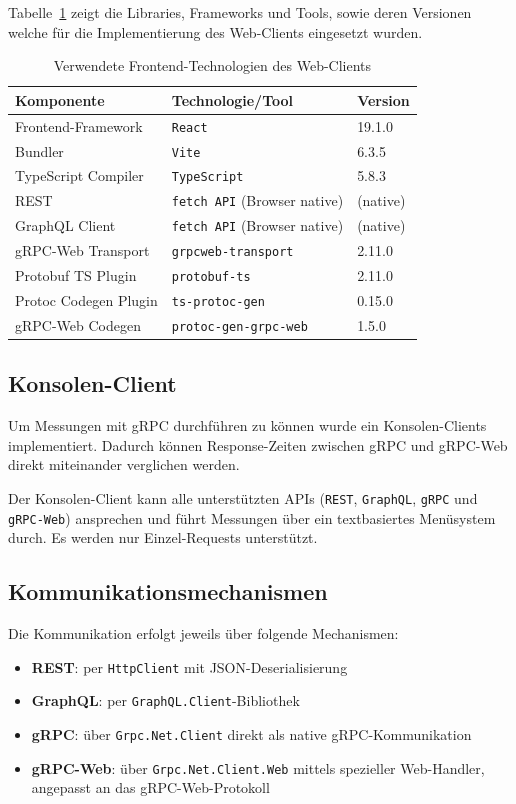 \begin{enumerate}
		Tabelle~\ref{tab:frontend-tech} zeigt die Libraries, Frameworks und Tools, sowie deren Versionen welche für die Implementierung des Web-Clients eingesetzt wurden.
	
	\begin{table}[h]
		\centering
		\caption{Verwendete Frontend-Technologien des Web-Clients}
	    \label{tab:frontend-tech}
		\begin{tabular}{lll}
			\hline
			\textbf{Komponente} & \textbf{Technologie/Tool} & \textbf{Version} \\
			\hline
			Frontend-Framework & \texttt{React} & 19.1.0 \\
			Bundler & \texttt{Vite} & 6.3.5 \\
			TypeScript Compiler & \texttt{TypeScript} & 5.8.3 \\
			REST & \texttt{fetch API} (Browser native) & (native) \\
			GraphQL Client & \texttt{fetch API} (Browser native) & (native) \\
			gRPC-Web Transport & \texttt{grpcweb-transport} & 2.11.0 \\
			Protobuf TS Plugin & \texttt{protobuf-ts} & 2.11.0 \\
			Protoc Codegen Plugin & \texttt{ts-protoc-gen} & 0.15.0 \\
			gRPC-Web Codegen & \texttt{protoc-gen-grpc-web} & 1.5.0 \\
			\hline
		\end{tabular}
	\end{table}
	
	\subsection{Konsolen-Client}
	 Um Messungen mit gRPC durchführen zu können wurde ein Konsolen-Clients implementiert. Dadurch können Response-Zeiten zwischen gRPC und gRPC-Web direkt miteinander verglichen werden.
	
	Der Konsolen-Client kann alle unterstützten APIs (\texttt{REST}, \texttt{GraphQL}, \texttt{gRPC} und \texttt{gRPC-Web}) ansprechen und führt Messungen über ein textbasiertes Menüsystem durch.  
	Es werden nur Einzel-Requests unterstützt.
	
	\subsection*{Kommunikationsmechanismen}
	Die Kommunikation erfolgt jeweils über folgende Mechanismen:
	\begin{itemize}
		\item \textbf{REST}: per \texttt{HttpClient} mit JSON-Deserialisierung
		\item \textbf{GraphQL}: per \texttt{GraphQL.Client}-Bibliothek
		\item \textbf{gRPC}: über \texttt{Grpc.Net.Client} direkt als native gRPC-Kommunikation
		\item \textbf{gRPC-Web}: über \texttt{Grpc.Net.Client.Web} mittels spezieller Web-Handler, angepasst an das gRPC-Web-Protokoll
	\end{itemize}
	

\end{enumerate}
